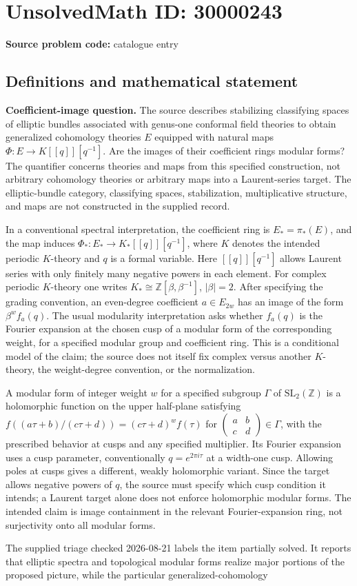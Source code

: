 \documentclass[11pt]{article}
\newcommand{\Z}{\mathbb{Z}}
\begin{document}
\section*{UnsolvedMath ID: 30000243}
\textbf{Source problem code:} catalogue entry
\subsection{Definitions and mathematical statement}
\textbf{Coefficient-image question.} The source describes stabilizing classifying spaces of elliptic bundles associated with genus-one conformal field theories to obtain generalized cohomology theories \(E\) equipped with natural maps \(\Phi:E\to K[[q]][q^{-1}]\). Are the images of their coefficient rings modular forms? The quantifier concerns theories and maps from this specified construction, not arbitrary cohomology theories or arbitrary maps into a Laurent-series target. The elliptic-bundle category, classifying spaces, stabilization, multiplicative structure, and maps are not constructed in the supplied record.\par In a conventional spectral interpretation, the coefficient ring is \(E_* = \pi_*(E)\), and the map induces \(\Phi_*:E_*\to K_*[[q]][q^{-1}]\), where \(K\) denotes the intended periodic \(K\)-theory and \(q\) is a formal variable. Here \([[q]][q^{-1}]\) allows Laurent series with only finitely many negative powers in each element. For complex periodic \(K\)-theory one writes \(K_*\cong\Z[\beta,\beta^{-1}]\), \(|\beta|=2\). After specifying the grading convention, an even-degree coefficient \(a\in E_{2w}\) has an image of the form \(\beta^w f_a(q)\). The usual modularity interpretation asks whether \(f_a(q)\) is the Fourier expansion at the chosen cusp of a modular form of the corresponding weight, for a specified modular group and coefficient ring. This is a conditional model of the claim; the source does not itself fix complex versus another \(K\)-theory, the weight-degree convention, or the normalization.\par A modular form of integer weight \(w\) for a specified subgroup \(\Gamma\) of \(\mathrm{SL}_2(\Z)\) is a holomorphic function on the upper half-plane satisfying \(f((a\tau+b)/(c\tau+d))=(c\tau+d)^w f(\tau)\) for \(\left(\begin{smallmatrix}a&b\\c&d\end{smallmatrix}\right)\in\Gamma\), with the prescribed behavior at cusps and any specified multiplier. Its Fourier expansion uses a cusp parameter, conventionally \(q=e^{2\pi i\tau}\) at a width-one cusp. Allowing poles at cusps gives a different, weakly holomorphic variant. Since the target allows negative powers of \(q\), the source must specify which cusp condition it intends; a Laurent target alone does not enforce holomorphic modular forms. The intended claim is image containment in the relevant Fourier-expansion ring, not surjectivity onto all modular forms.\par The supplied triage checked 2026-08-21 labels the item partially solved. It reports that elliptic spectra and topological modular forms realize major portions of the proposed picture, while the particular generalized-cohomology 
\end{document}
